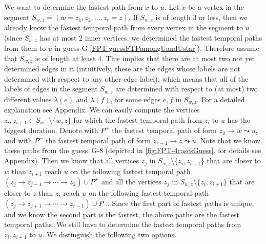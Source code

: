 \documentclass[a4paper,UKenglish,cleveref, autoref, thm-restate,anonymous]{lipics-v2021}
\begin{document}
We want to determine the fastest path from $x$ to $u$.
Let $x$ be a vertex in the segment $S_{w,z} = (w=z_1,z_2, \dots, z_r = z)$.
If $S_{w,z}$ is of length $3$ or less, then we already know the fastest temporal path from every vertex in the segment to $u$ 
(since $S_{w,z}$ has at most $2$ inner vertices, we determined the fastest temporal paths from them to $u$ in guess G-\ref{FPT-guessFTPamongUandUstar}).
Therefore assume that $S_{w,z}$ is of length at least $4$.
This implies that there are at most two not yet determined edges in it (intuitively, these are the edges whose labels are not determined with respect to any other edge label), which means that all of the labels of edges in the segment $S_{w,z}$ are determined with respect to (at most) two different values $\lambda(e)$ and $\lambda(f)$, for some edges $e,f$ in $S_{w,z}$. For a detailed explanation see Appendix.
We can easily compute the vertices $z_i, z_{i+1} \in S_{w,z}\setminus\{w,z\}$ for which the fastest temporal path from $z_i$ to $u$ has the biggest duration.
Denote with $P^+$ the fastest temporal path of form $z_2 \rightarrow w \leadsto u$,
and with $P^-$ the fastest temporal path of form $z_{r-1} \rightarrow z \leadsto u$.
Note that we know these paths from the guess~G-8 (depicted in \cref{fig:FPT-4casesGuess}, for details see Appendix).
Then we know that all vertices $z_j$ in $S_{w,z} \setminus\{z_i,z_{i+1}\}$ that are closer to $w$ than $z_{i+1}$ reach $u$ on the 
following fastest temporal path $(z_j \rightarrow z_{j-1} \rightarrow \cdots \rightarrow z_2) \cup P^+$ 
and
all the vertices $z_j$ in $S_{w,z}\setminus\{z_i,z_{i+1}\}$ that are closer to $z$ than $z_i$ reach $u$ on the 
following fastest temporal path
$(z_j \rightarrow z_{j+1} \rightarrow \cdots \rightarrow z_{r-1}) \cup P^-$.
Since the first part of fastest paths is unique, and we know the second part is the fastest, the above paths are the fastest temporal paths.
We still have to determine the fastest temporal paths from $z_i,z_{i+1}$ to $u$.
We distinguish the following two options.
\end{document}

